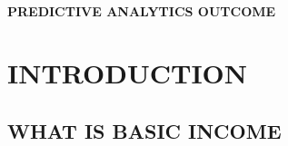 \documentclass[11pt]{article}
\begin{document}
\hypertarget{predictive-analytics-outcome}{%
\paragraph{PREDICTIVE ANALYTICS
OUTCOME}\label{predictive-analytics-outcome}}

    \hypertarget{introduction}{%
\section{INTRODUCTION}\label{introduction}}

\hypertarget{what-is-basic-income}{%
\subsection{WHAT IS BASIC INCOME}\label{what-is-basic-income}}
\end{document}
